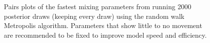 \documentclass[
]{scrartcl}
\begin{document}
\begin{figure}[H]


\caption{\label{fig-pairs_plot_fast}Pairs plots of the fastest mixing
parameters from running 2000 posterior draws (keeping every draw) using
the random walk Metropolis algorithm. Parameters that show little to no
movement are recommended to be fixed to improve model speed and
efficiency.}

\end{figure}%
\end{document}
